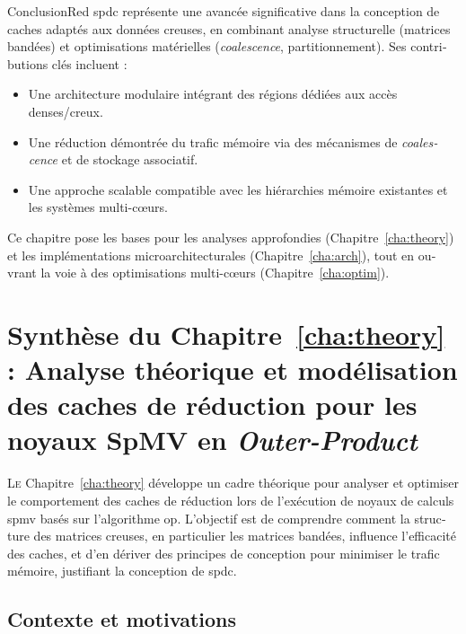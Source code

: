 \begin{otherlanguage}{french}
\bigskip
\begin{highlight}{Conclusion}{Red}
    \acrlong{spdc} représente une avancée significative dans la conception de caches adaptés aux données creuses, en combinant analyse structurelle (matrices bandées) et optimisations matérielles (\textit{coalescence}, partitionnement).
    Ses contributions clés incluent :
    \begin{itemize}
        \item Une architecture modulaire intégrant des régions dédiées aux accès denses/creux.
        \item Une réduction démontrée du trafic mémoire via des mécanismes de \textit{coalescence} et de stockage associatif.
        \item Une approche scalable compatible avec les hiérarchies mémoire existantes et les systèmes multi-c\oe{}urs.
    \end{itemize}
    Ce chapitre pose les bases pour les analyses approfondies (Chapitre~\ref{cha:theory}) et les implémentations microarchitecturales (Chapitre~\ref{cha:arch}), tout en ouvrant la voie à des optimisations multi-c\oe{}urs (Chapitre~\ref{cha:optim}).
\end{highlight}


\addtocounter{synthFCnt}{1}
\section{Synthèse du Chapitre~\ref{cha:theory} : Analyse théorique et modélisation des caches de réduction pour les noyaux SpMV en \textit{Outer-Product}}

\lettrine{L}{e} Chapitre~\ref{cha:theory} développe un cadre théorique pour analyser et optimiser le comportement des caches de réduction lors de l'exécution de noyaux de calculs \acrshort{spmv} basés sur l'algorithme \acrfull{op}. L'objectif est de comprendre comment la structure des matrices creuses, en particulier les matrices bandées, influence l'efficacité des caches, et d'en dériver des principes de conception pour minimiser le trafic mémoire, justifiant la conception de \acrlong{spdc}.

\subsection*{Contexte et motivations}


\end{otherlanguage}
